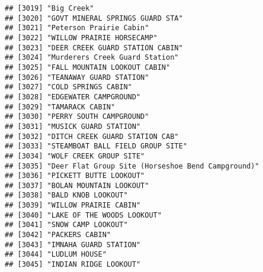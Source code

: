\documentclass[
]{article}
\begin{document}
\begin{verbatim}
## [3019] "Big Creek"                                                                           
## [3020] "GOVT MINERAL SPRINGS GUARD STA"                                                      
## [3021] "Peterson Prairie Cabin"                                                              
## [3022] "WILLOW PRAIRIE HORSECAMP"                                                            
## [3023] "DEER CREEK GUARD STATION CABIN"                                                      
## [3024] "Murderers Creek Guard Station"                                                       
## [3025] "FALL MOUNTAIN LOOKOUT CABIN"                                                         
## [3026] "TEANAWAY GUARD STATION"                                                              
## [3027] "COLD SPRINGS CABIN"                                                                  
## [3028] "EDGEWATER CAMPGROUND"                                                                
## [3029] "TAMARACK CABIN"                                                                      
## [3030] "PERRY SOUTH CAMPGROUND"                                                              
## [3031] "MUSICK GUARD STATION"                                                                
## [3032] "DITCH CREEK GUARD STATION CAB"                                                       
## [3033] "STEAMBOAT BALL FIELD GROUP SITE"                                                     
## [3034] "WOLF CREEK GROUP SITE"                                                               
## [3035] "Deer Flat Group Site (Horseshoe Bend Campground)"                                    
## [3036] "PICKETT BUTTE LOOKOUT"                                                               
## [3037] "BOLAN MOUNTAIN LOOKOUT"                                                              
## [3038] "BALD KNOB LOOKOUT"                                                                   
## [3039] "WILLOW PRAIRIE CABIN"                                                                
## [3040] "LAKE OF THE WOODS LOOKOUT"                                                           
## [3041] "SNOW CAMP LOOKOUT"                                                                   
## [3042] "PACKERS CABIN"                                                                       
## [3043] "IMNAHA GUARD STATION"                                                                
## [3044] "LUDLUM HOUSE"                                                                        
## [3045] "INDIAN RIDGE LOOKOUT"                                                                

\end{verbatim}
\end{document}
